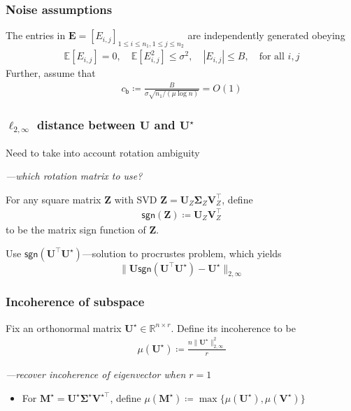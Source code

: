 \documentclass[compress,
mathserif,wide,%
]{beamer}
\begin{document}
\begin{frame}
	\frametitle{Noise assumptions}


	The entries in $\bm{E}=[E_{i,j}]_{1 \leq i \leq n_1, 1 \leq j \leq n_2}$ are independently generated obeying
%
\begin{align*}
	\mathbb{E}[E_{i,j}] = 0, \quad \mathbb{E}[E_{i,j}^2]\leq \sigma^2, \quad |E_{i,j}|\leq B, \quad \text{for all }i, j
\end{align*}
%
	Further,  assume that 
	\begin{align*}
		c_{\mathsf{b}} \coloneqq \frac{B}{  \sigma  \sqrt{n_1/(\mu\log n)} } = O(1)
	\end{align*}
	
\end{frame}

\begin{frame}
	\frametitle{$\ell_{2,\infty}$ distance between $\bm{U}$ and $\bm{U}^\star$}
	Need to take into account rotation ambiguity
	
	{\hfill \em ---which rotation matrix to use?}
	
	\vfill
	\begin{definition} For any square matrix $\bm{Z}$ with SVD $\bm{Z}=\bm{U}_{Z}\bm{\Sigma}_Z\bm{V}_{Z}^{\top}$, define
%
\begin{align}
	\mathsf{sgn}(\bm{Z}) \coloneqq \bm{U}_{Z}  \bm{V}_{Z}^{\top}
	\label{eq:defn-sgn-Z}
\end{align}
%
to be the matrix sign function of $\bm{Z}$.
\end{definition}

\vfill
Use $\mathsf{sgn}(\bm{U}^\top \bm{U}^\star)$---solution to procrustes problem, which yields
\[
\|\bm{U}\mathsf{sgn}(\bm{U}^\top \bm{U}^\star)-\bm{U}^{\star}\|_{2,\infty}
\]
\end{frame}

\begin{frame}
	\frametitle{Incoherence of subspace}
	\begin{definition}
	Fix an orthonormal matrix $\bm{U}^\star \in \mathbb{R}^{n \times r}$. Define its incoherence to be
	\begin{align*}
	\mu(\bm{U}^\star) \coloneqq \frac{n\|\bm{U}^{\star}\|_{2,\infty}^{2}}{r} 
\end{align*}
\end{definition}

{\hfill \em ---recover incoherence of eigenvector when $r=1$}

\vfill 
\begin{itemize}
	\item For $\bm{M}^{\star} = \bm{U}^{\star}\bm{\Sigma}^{\star}\bm{V}^{\star\top}$, define $\mu(\bm{M}^\star) \coloneqq \max\{\mu(\bm{U}^\star), \mu(\bm{V}^\star)\}$
\end{itemize}
\end{frame}
\end{document}
